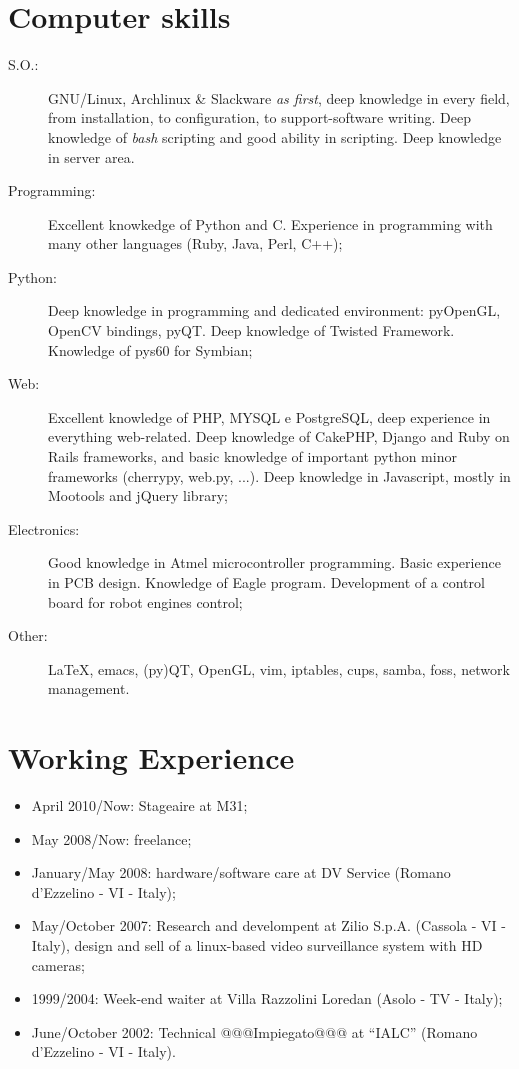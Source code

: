 \documentclass[pdftex, a4paper, 11pt]{article}
\begin{document}
\section*{Computer skills}
\begin{description}
\item[S.O.:] GNU/Linux, Archlinux \& Slackware {\em as first}, deep knowledge
  in every field, from installation, to configuration, to support-software
  writing. Deep knowledge of {\em bash} scripting and good ability in scripting.
  Deep knowledge in server area.
\item[Programming:] Excellent knowkedge of Python and C. Experience in programming
  with many other languages (Ruby, Java, Perl, C++);
\item[Python:] Deep knowledge in programming and dedicated environment: pyOpenGL,
  OpenCV bindings, pyQT. Deep knowledge of Twisted Framework. Knowledge of pys60
  for Symbian;
\item[Web:] Excellent knowledge of PHP, MYSQL e PostgreSQL, deep experience in 
  everything web-related. Deep knowledge of CakePHP, Django and Ruby on Rails frameworks,
  and basic knowledge of important python minor frameworks (cherrypy, web.py, ...). Deep
  knowledge in Javascript, mostly in Mootools and jQuery library;
\item[Electronics:] Good knowledge in Atmel microcontroller programming. Basic experience
  in PCB design. Knowledge of Eagle program. Development of a control board for robot
  engines control;
\item[Other:] \LaTeX, emacs, (py)QT, OpenGL, vim, iptables, cups,
  samba, foss, network management.
\end{description}

\section*{Working Experience}
\begin{itemize}
\item April 2010/Now: Stageaire at M31;
\item May 2008/Now: freelance;
\item January/May 2008: hardware/software care at DV Service (Romano d'Ezzelino - VI - Italy);
\item May/October 2007: Research and develompent at Zilio
  S.p.A. (Cassola - VI - Italy), design and sell of a linux-based video surveillance
  system with HD cameras;
\item 1999/2004: Week-end waiter at Villa Razzolini Loredan (Asolo - TV - Italy);
\item June/October 2002: Technical @@@Impiegato@@@ at ``IALC'' (Romano d'Ezzelino - VI - Italy).
\end{itemize}
\end{document}
